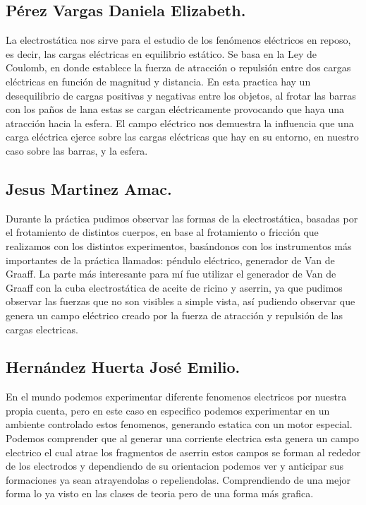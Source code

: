 \documentclass[spanish,10pt,a4paper,onecolumn]{article}
\begin{document}
\subsection{Pérez Vargas Daniela Elizabeth.}
La electrostática nos sirve para el estudio de los fenómenos eléctricos en reposo, es decir, las cargas eléctricas en equilibrio estático. Se basa en la Ley de Coulomb, en donde establece la fuerza de atracción o repulsión entre dos cargas eléctricas en función de magnitud y distancia. En esta practica hay un desequilibrio de cargas positivas y negativas entre los objetos, al frotar las barras con los paños de lana estas se cargan eléctricamente provocando que haya una atracción hacia la esfera. El campo eléctrico nos demuestra la influencia que una carga eléctrica ejerce sobre las cargas eléctricas que hay en su entorno, en nuestro caso sobre las barras, y la esfera.
\subsection{Jesus Martinez Amac.}

Durante la práctica pudimos observar las formas de la electrostática, basadas por el frotamiento de distintos cuerpos, en base al frotamiento o fricción que realizamos con los distintos experimentos, basándonos con los instrumentos más importantes de la práctica llamados: péndulo eléctrico, generador de Van de Graaff. La parte más interesante para mí fue utilizar el generador de Van de Graaff con la cuba electrostática de aceite de ricino y aserrin, ya que pudimos observar las fuerzas que no son visibles a simple vista, así pudiendo observar que genera un campo eléctrico creado por la fuerza de atracción y repulsión de las cargas electricas.

\subsection{Hernández Huerta José Emilio.}
En el mundo podemos experimentar diferente fenomenos electricos por nuestra propia cuenta, pero en este caso en especifico podemos experimentar en un ambiente controlado estos fenomenos, generando estatica con un motor especial. 
Podemos comprender que al generar una corriente electrica esta genera un campo electrico el cual atrae los fragmentos de aserrin estos campos se forman al rededor de los electrodos y dependiendo de su orientacion podemos ver y anticipar sus formaciones ya sean atrayendolas o repeliendolas. Comprendiendo de una mejor forma lo ya visto en las clases de teoria pero de una forma más grafica.
\end{document}

